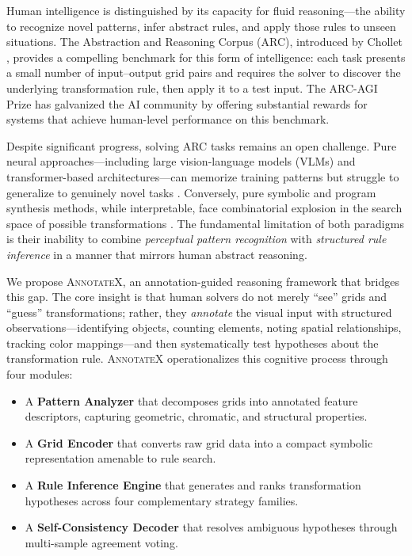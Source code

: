 \documentclass[conference,10pt,letterpaper]{IEEEtran}
\newcommand{\annotatexname}{\textsc{AnnotateX}}
\begin{document}
Human intelligence is distinguished by its capacity for fluid reasoning---the ability to recognize novel patterns, infer abstract rules, and apply those rules to unseen situations. The Abstraction and Reasoning Corpus (ARC), introduced by Chollet \cite{chollet2019measure}, provides a compelling benchmark for this form of intelligence: each task presents a small number of input--output grid pairs and requires the solver to discover the underlying transformation rule, then apply it to a test input. The ARC-AGI Prize \cite{arcprize2020} has galvanized the AI community by offering substantial rewards for systems that achieve human-level performance on this benchmark.

Despite significant progress, solving ARC tasks remains an open challenge. Pure neural approaches---including large vision-language models (VLMs) and transformer-based architectures---can memorize training patterns but struggle to generalize to genuinely novel tasks \cite{mitchell2021abstraction}. Conversely, pure symbolic and program synthesis methods, while interpretable, face combinatorial explosion in the search space of possible transformations \cite{ellis2021dreamcoder}. The fundamental limitation of both paradigms is their inability to combine \emph{perceptual pattern recognition} with \emph{structured rule inference} in a manner that mirrors human abstract reasoning.

We propose \annotatexname, an annotation-guided reasoning framework that bridges this gap. The core insight is that human solvers do not merely ``see'' grids and ``guess'' transformations; rather, they \emph{annotate} the visual input with structured observations---identifying objects, counting elements, noting spatial relationships, tracking color mappings---and then systematically test hypotheses about the transformation rule. \annotatexname{} operationalizes this cognitive process through four modules:

\begin{itemize}[leftmargin=*,nosep]
    \item A \textbf{Pattern Analyzer} that decomposes grids into annotated feature descriptors, capturing geometric, chromatic, and structural properties.
    \item A \textbf{Grid Encoder} that converts raw grid data into a compact symbolic representation amenable to rule search.
    \item A \textbf{Rule Inference Engine} that generates and ranks transformation hypotheses across four complementary strategy families.
    \item A \textbf{Self-Consistency Decoder} that resolves ambiguous hypotheses through multi-sample agreement voting.
\end{itemize}
\end{document}
